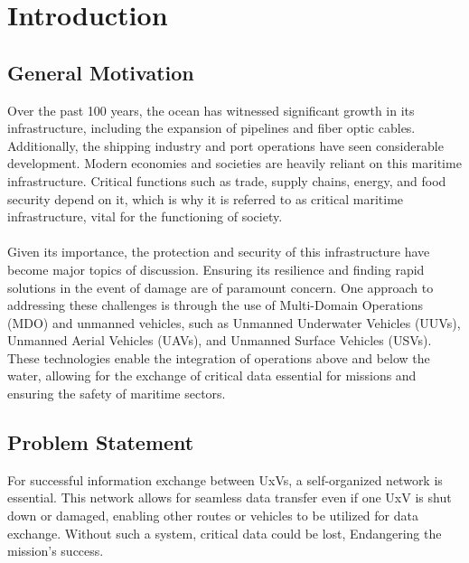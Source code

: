 \documentclass[]{nsm-thesis}
\begin{document}
\cleardoublepage
\tableofcontents


\cleardoublepage
{}


\chapter{Introduction}
\label{sec:introduction}
\section{General Motivation}
Over the past 100 years, the ocean has witnessed significant growth in its infrastructure, including the expansion of pipelines and fiber optic cables. Additionally, the shipping industry and port operations have seen considerable development. Modern economies and societies are heavily reliant on this maritime infrastructure. Critical functions such as trade, supply chains, energy, and food security depend on it, which is why it is referred to as critical maritime infrastructure, vital for the functioning of society.\cite{BUEGER2023105772}\\
\\
Given its importance, the protection and security of this infrastructure have become major topics of discussion. Ensuring its resilience and finding rapid solutions in the event of damage are of paramount concern. One approach to addressing these challenges is through the use of Multi-Domain Operations (MDO) and unmanned vehicles, such as Unmanned Underwater Vehicles (UUVs), Unmanned Aerial Vehicles (UAVs), and Unmanned Surface Vehicles (USVs). These technologies enable the integration of operations above and below the water, allowing for the exchange of critical data essential for missions and ensuring the safety of maritime sectors.

\section{Problem Statement}
For successful information exchange between UxVs, a self-organized network is essential. This network allows for seamless data transfer even if one UxV is shut down or damaged, enabling other routes or vehicles to be utilized for data exchange. Without such a system, critical data could be lost, Endangering the mission's success.
\end{document}
